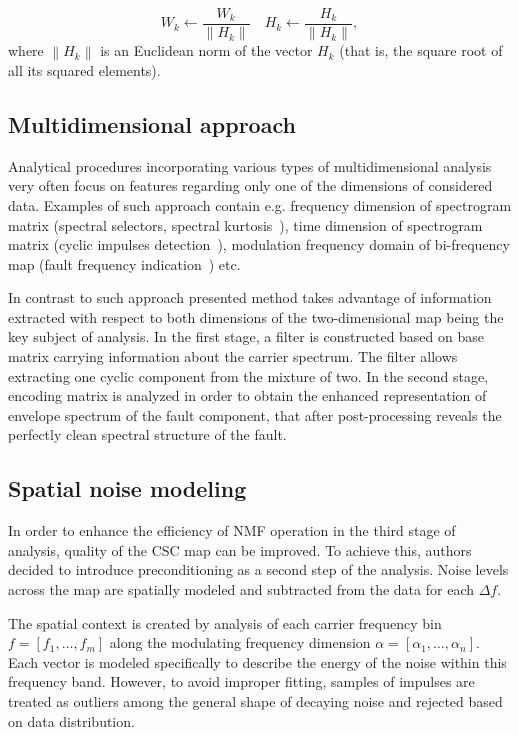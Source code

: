 \documentclass[3p, 12pt]{elsarticle} %
\newcommand{\norm}[1]{\left\lVert#1\right\rVert}
\begin{document}
\begin{equation}
    W_{k} \leftarrow \frac{W_{k}}{\norm{H_{k}}}
    \quad
    H_{k} \leftarrow \frac{H_{k}}{\norm{H_{k}}},
\end{equation}
where $\norm{H_{k}}$ is an Euclidean norm of the vector $H_{k}$ (that is, the square root of all its squared elements).

\subsection{Multidimensional approach}

Analytical procedures incorporating various types of multidimensional analysis very often focus on features regarding only one of the dimensions of considered data. Examples of such approach contain e.g. frequency dimension of spectrogram matrix (spectral selectors, spectral kurtosis~\cite{antoni2006spectral}), time dimension of spectrogram matrix (cyclic impulses detection~\cite{kruczek2017cyclic}), modulation frequency domain of bi-frequency map (fault frequency indication~\cite{kruczek2017multiple}) etc. 

In contrast to such approach presented method takes advantage of information extracted with respect to both dimensions of the two-dimensional map being the key subject of analysis. In the first stage, a filter is constructed based on base matrix carrying information about the carrier spectrum. The filter allows extracting one cyclic component from the mixture of two. In the second stage, encoding matrix is analyzed in order to obtain the enhanced representation of envelope spectrum of the fault component, that after post-processing reveals the perfectly clean spectral structure of the fault.

\subsection{Spatial noise modeling}\label{denoise}

In order to enhance the efficiency of NMF operation in the third stage of analysis, quality of the CSC map can be improved. To achieve this, authors decided to introduce preconditioning as a second step of the analysis. Noise levels across the map are spatially modeled and subtracted from the data for each $\Delta f$. 

The spatial context is created by analysis of each carrier frequency bin $f = \left[f_1, \dots ,f_m \right]$ along the modulating frequency dimension $\alpha = \left[\alpha_1, \dots ,\alpha_n \right]$. Each vector is modeled specifically to describe the energy of the noise within this frequency band. However, to avoid improper fitting, samples of impulses are treated as outliers among the general shape of decaying noise and rejected based on data distribution. 
\end{document}
